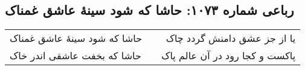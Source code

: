 \begin{center}
\section*{رباعی شماره ۱۰۷۳: حاشا که شود سینهٔ عاشق غمناک}
\label{sec:1073}
\begin{longtable}{l p{0.5cm} r}
حاشا که شود سینهٔ عاشق غمناک
&&
یا از جز عشق دامنش گردد چاک
\\
حاشا که بخفت عاشقی اندر خاک
&&
پاکست و کجا رود در آن عالم پاک
\\
\end{longtable}
\end{center}
